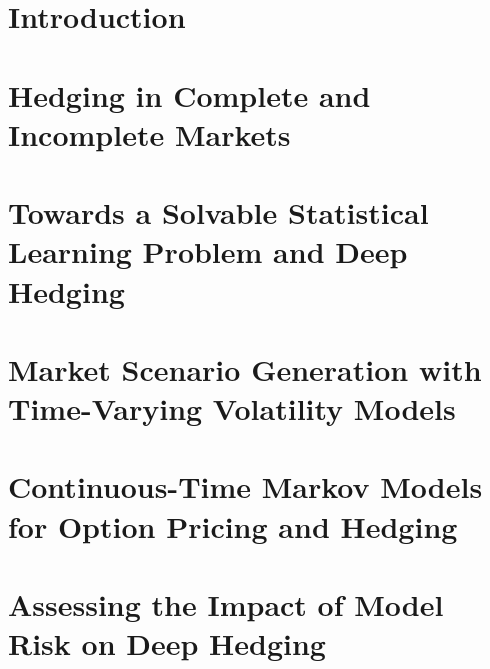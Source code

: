 \documentclass[english, 11pt]{article}
\begin{document}

\clearpage

\thispagestyle{empty}


\clearpage

{ \tableofcontents }
\thispagestyle{empty}

\clearpage
\setcounter{page}{1}
\section{Introduction} \label{section:Introduction}

\clearpage

\section{Hedging in Complete and Incomplete Markets}
\label{section:Setting}

\clearpage

\section{Towards a Solvable Statistical Learning Problem and Deep Hedging}
\label{section:DeepHedging}

\clearpage

\section{Market Scenario Generation with Time-Varying Volatility Models} \label{section:volmodels}

\clearpage

\section{Continuous-Time Markov Models for Option Pricing and Hedging}
\label{section:benchmark}

\clearpage

\section{Assessing the Impact of Model Risk on Deep Hedging} 
\label{section:simulation_deephedging}

\clearpage
\end{document}
